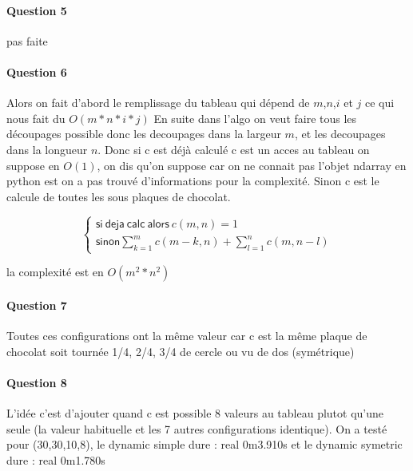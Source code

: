 \documentclass[a4paper,10pt]{article}
\begin{document}
\paragraph{Question 5}
pas faite

\paragraph{Question 6}
Alors on fait d'abord le remplissage du tableau qui dépend de $m$,$n$,$i$ et $j$ ce qui nous fait du $O(m*n*i*j)$
En suite dans l'algo on veut faire tous les découpages possible donc les decoupages dans la largeur $m$, et les decoupages dans la longueur $n$.
Donc si c est déjà calculé c est un acces au tableau on suppose en $O(1)$, on dis qu'on suppose car on ne connait pas l'objet ndarray en python est on a pas trouvé 
d'informations pour la complexité. Sinon c est le calcule de toutes les sous plaques de chocolat.

\[
\left \{
\begin{array}{c}
    \mathsf{si\: deja\: calc\: alors}\: c(m,n) = 1 \\
    \mathsf{sinon} \sum_{k=1}^m c(m-k,n) + \sum_{l=1}^n c(m,n-l) 
\end{array}
\right.
\]

la complexité est en $O(m^2*n^2)$

\paragraph{Question 7}
Toutes ces configurations ont la même valeur car c est la même plaque de chocolat soit tournée 1/4, 2/4, 3/4 de cercle ou vu de dos (symétrique)

\paragraph{Question 8}
L'idée c'est d'ajouter quand c est possible 8 valeurs au tableau plutot qu'une seule (la valeur habituelle et les 7 autres configurations identique).
On a testé pour (30,30,10,8), le dynamic simple dure : real 0m3.910s et le dynamic symetric dure : real 0m1.780s
\end{document}
